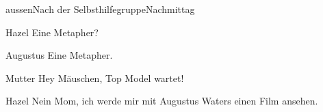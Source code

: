 \documentclass[12pt]{article}
\begin{document}
\begin{scene}[cut to]{aussen}{Nach der Selbsthilfegruppe}{Nachmittag}
        \begin{dialog}[argwöhnisch]{Hazel}
            Eine Metapher?
        \end{dialog}

        \begin{dialog}{Augustus}
            Eine Metapher.
        \end{dialog}


        \begin{dialog}{Mutter}
            Hey Mäuschen, Top Model wartet!
        \end{dialog}

        \begin{dialog}{Hazel}
            Nein Mom, ich werde mir mit \gls{Augustus} Waters einen Film ansehen.
        \end{dialog}
    \end{scene}
\end{document}
